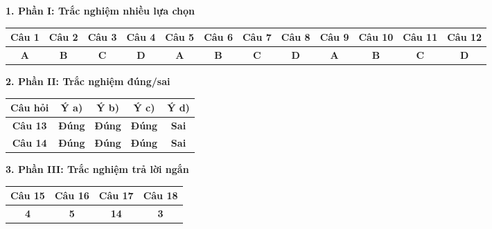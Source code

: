 \documentclass[12pt,a4paper]{article}
\begin{document}
\vspace{0.2cm}
\textbf{1. Phần I: Trắc nghiệm nhiều lựa chọn}
\begin{center}
{\setlength{\tabcolsep}{2.5pt}\small
\begin{tabular}{|c|c|c|c|c|c|c|c|c|c|c|c|}
\hline
\textbf{Câu 1} & \textbf{Câu 2} & \textbf{Câu 3} & \textbf{Câu 4} & \textbf{Câu 5} & \textbf{Câu 6} & \textbf{Câu 7} & \textbf{Câu 8} & \textbf{Câu 9} & \textbf{Câu 10} & \textbf{Câu 11} & \textbf{Câu 12} \\
\hline
\textbf{A} & \textbf{B} & \textbf{C} & \textbf{D} & \textbf{A} & \textbf{B} & \textbf{C} & \textbf{D} & \textbf{A} & \textbf{B} & \textbf{C} & \textbf{D} \\
\hline
\end{tabular}}
\end{center}

\vspace{0.2cm}
\textbf{2. Phần II: Trắc nghiệm đúng/sai}
\begin{center}
\begin{tabular}{|c|c|c|c|c|}
\hline
\textbf{Câu hỏi} & \textbf{Ý a)} & \textbf{Ý b)} & \textbf{Ý c)} & \textbf{Ý d)} \\
\hline
\textbf{Câu 13} & \textbf{Đúng} & \textbf{Đúng} & \textbf{Đúng} & \textbf{Sai} \\
\hline
\textbf{Câu 14} & \textbf{Đúng} & \textbf{Đúng} & \textbf{Đúng} & \textbf{Sai} \\
\hline
\end{tabular}
\end{center}

\vspace{0.2cm}
\textbf{3. Phần III: Trắc nghiệm trả lời ngắn}
\begin{center}
\begin{tabular}{|c|c|c|c|}
\hline
\textbf{Câu 15} & \textbf{Câu 16} & \textbf{Câu 17} & \textbf{Câu 18} \\
\hline
\textbf{4} & \textbf{5} & \textbf{14} & \textbf{3} \\
\hline
\end{tabular}
\end{center}
\end{document}
